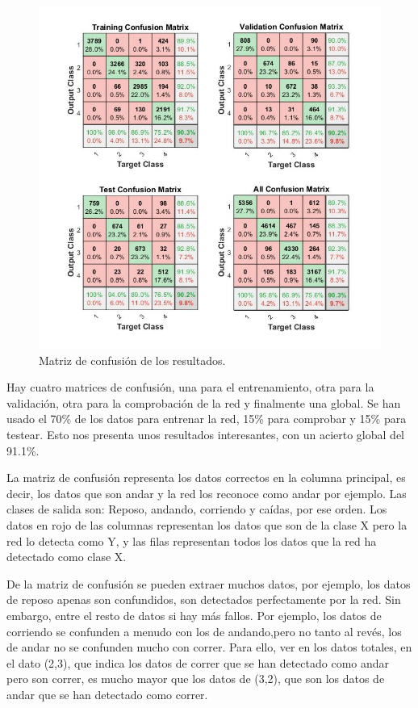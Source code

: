 \documentclass[12pt]{article}
\numberwithin{equation}{section}
\begin{document}
{\begin{figure}[h]
    \centering
    \includegraphics[width=1\textwidth]{confussionplaceholder.jpg}
    \caption{Matriz de confusión de los resultados.}
    \label{fig:mesh2}
\end{figure}

Hay cuatro matrices de confusión, una para el entrenamiento, otra para la validación, otra para la comprobación de la red y finalmente una global. Se han usado el 70\% de los datos para entrenar la red, 15\% para comprobar y 15\% para testear. Esto nos presenta unos resultados interesantes, con un acierto global del 91.1\%.

La matriz de confusión representa los datos correctos en la columna principal, es decir, los datos que son andar y la red los reconoce como andar por ejemplo. Las clases de salida son: Reposo, andando, corriendo y caídas, por ese orden. Los datos en rojo de las columnas representan los datos que son de la clase X pero la red lo detecta como Y, y las filas representan todos los datos que la red ha detectado como clase X.

De la matriz de confusión se pueden extraer muchos datos, por ejemplo, los datos de reposo apenas son confundidos, son detectados perfectamente por la red. Sin embargo, entre el resto de datos si hay más fallos. Por ejemplo, los datos de corriendo se confunden a menudo con los de andando,pero no tanto al revés, los de andar no se confunden mucho con correr. Para ello, ver en los datos totales, en el dato (2,3), que indica los datos de correr que se han detectado como andar pero son correr, es mucho mayor que los datos de (3,2), que son los datos de andar que se han detectado como correr.

}
\end{document}
